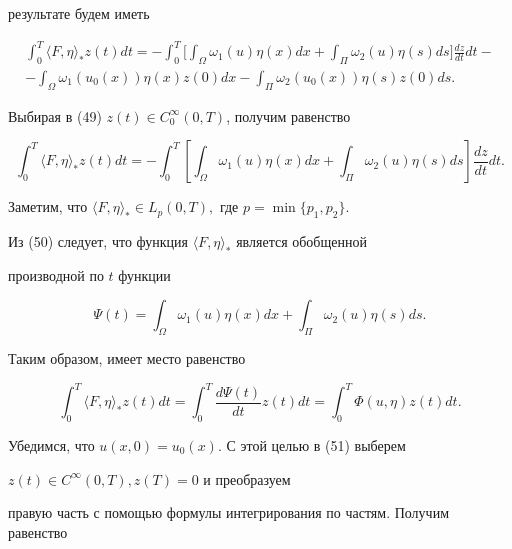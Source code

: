 результате будем иметь 


\begin{multline} 


\int^T_0\langle F,\eta\rangle_* z(t) dt = 


-\int^T_0 \biggl [\int_\Omega \omega_1(u)\eta(x)dx + 


\int_\Pi \omega_2(u)\eta(s)ds\biggr ] \frac{dz}{dt}dt -\\ 


-\int_\Omega \omega_1(u_0(x))\eta(x)z(0)dx - 


\int_\Pi \omega_2(u_0(x))\eta(s)z(0)ds. 


\end{multline} 


Выбирая в (49) $z(t)\in C^\infty_0(0,T)$, получим равенство 


\begin{equation} 


\int^T_0\langle F,\eta\rangle_* z(t) dt = 


-\int^T_0 [\int_\Omega \omega_1(u)\eta(x)dx + 


\int_\Pi \omega_2(u)\eta(s)ds] \frac{dz}{dt}dt.


\end{equation} 


Заметим, что $\langle F,\eta\rangle_*\in L_p(0,T),$ где $p=\min\{p_1,p_2\}$. 


Из (50) следует, что функция $\langle F,\eta\rangle_*$ является обобщенной 


производной по $t$ функции  


$$ 


\Psi(t) = \int_\Omega \omega_1(u)\eta(x)dx + 


\int_\Pi \omega_2(u)\eta(s)ds. 


$$ 


Таким образом, имеет место равенство 


\begin{equation} 


\int^T_0\langle F,\eta\rangle_* z(t) dt =\int^T_0 


\frac{d\Psi(t)}{dt}z(t)dt = \int^T_0\Phi(u,\eta)z(t)dt.


\end{equation} 


Убедимся, что $u(x,0)=u_0(x)$. С этой целью в (51) выберем  


$z(t)\in C^\infty(0,T), z(T)=0$ и преобразуем 


правую часть с помощью формулы интегрирования по частям. Получим равенство 


